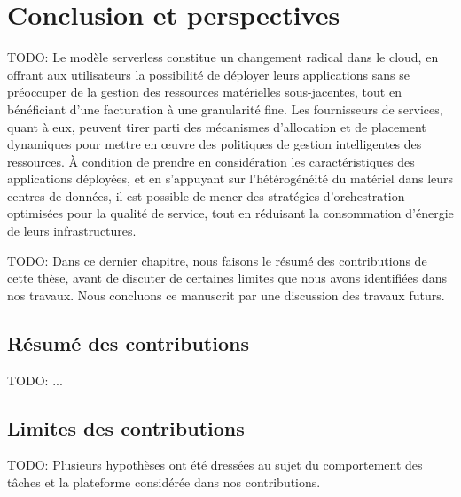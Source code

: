 \chapter{Conclusion et perspectives}
\label{chapter:conclusion}

TODO: Le modèle serverless constitue un changement radical dans le cloud, en offrant aux utilisateurs la possibilité de déployer leurs applications sans se préoccuper de la gestion des ressources matérielles sous-jacentes, tout en bénéficiant d'une facturation à une granularité fine. Les fournisseurs de services, quant à eux, peuvent tirer parti des mécanismes d'allocation et de placement dynamiques pour mettre en œuvre des politiques de gestion intelligentes des ressources. À condition de prendre en considération les caractéristiques des applications déployées, et en s'appuyant sur l'hétérogénéité du matériel dans leurs centres de données, il est possible de mener des stratégies d'orchestration optimisées pour la qualité de service, tout en réduisant la consommation d'énergie de leurs infrastructures.

TODO: Dans ce dernier chapitre, nous faisons le résumé des contributions de cette thèse, avant de discuter de certaines limites que nous avons identifiées dans nos travaux. Nous concluons ce manuscrit par une discussion des travaux futurs.

\section{Résumé des contributions}
\label{section:conclusion-summary}

TODO: ...

\section{Limites des contributions}
\label{section:conclusion-limits}

TODO: Plusieurs hypothèses ont été dressées au sujet du comportement des tâches et la plateforme considérée dans nos contributions.

